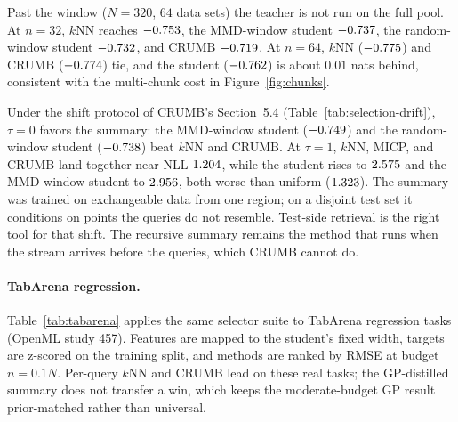 \documentclass{article}
\begin{document}
Past the window ($N = 320$, $64$ data sets) the teacher is not run on the
full pool. At $n = 32$, $k$NN reaches $-0.753$, the
MMD-window student $-0.737$, the random-window student
$-0.732$, and CRUMB $-0.719$. At
$n = 64$, $k$NN ($-0.775$) and CRUMB
($-0.774$) tie, and the student
($-0.762$) is about $0.01$ nats behind, consistent with the
multi-chunk cost in Figure~\ref{fig:chunks}.

\begin{table}[htbp]
\centering
\caption{Covariate drift along $x$, budget $n = 32$, training pool from the
lower half of $x$, capped at $160$ points ($40$ data sets). $\tau = 0$ tests
inside that half; $\tau = 1$ tests on the disjoint upper half. Mean $\pm$
s.e.}
\label{tab:selection-drift}

\end{table}

Under the shift protocol of CRUMB's Section~5.4
(Table~\ref{tab:selection-drift}), $\tau = 0$ favors the summary: the
MMD-window student ($-0.749$) and the random-window student
($-0.738$) beat $k$NN and CRUMB. At $\tau = 1$, $k$NN, MICP, and
CRUMB land together near NLL $1.204$, while the student rises
to $2.575$ and the MMD-window student to
$2.956$, both worse than uniform
($1.323$). The summary was trained on exchangeable data
from one region; on a disjoint test set it conditions on points the queries
do not resemble. Test-side retrieval is the right tool for that shift. The
recursive summary remains the method that runs when the stream arrives before
the queries, which CRUMB cannot do.

\paragraph{TabArena regression.}
Table~\ref{tab:tabarena} applies the same selector suite to TabArena
regression tasks (OpenML study 457). Features are mapped to the student's
fixed width, targets are z-scored on the training split, and methods are
ranked by RMSE at budget $n = 0.1N$. Per-query $k$NN and CRUMB lead on
these real tasks; the GP-distilled summary does not transfer a win, which
keeps the moderate-budget GP result prior-matched rather than universal.

\begin{table}[htbp]
\centering
\caption{Context selection on TabArena regression. Budget $n = 0.1N$.
Average rank and mean RMSE on standardized targets (lower is better).}
\label{tab:tabarena}

\end{table}
\end{document}
